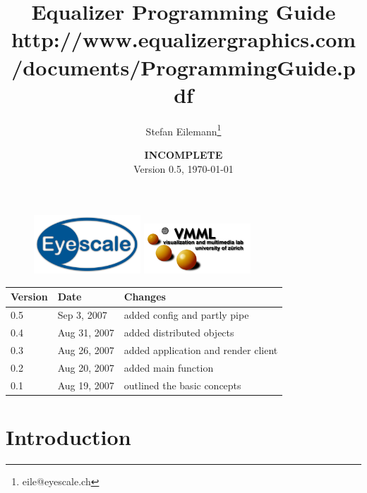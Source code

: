 \documentclass[10pt,a4]{scrartcl}
\title{Equalizer Programming Guide\\
  {\footnotesize\mdseries
    \htmladdnormallink{http://www.equalizergraphics.com/documents/Developer/ProgrammingGuide.pdf}
    {http://www.equalizergraphics.com/documents/ProgrammingGuide.pdf}}
}
\author{Stefan Eilemann\thanks{eile@eyescale.ch}\\[\medskipamount]
}
\date{
  \textbf{INCOMPLETE}\\[\medskipamount]
  Version 0.5, \today
}
\begin{document}
\maketitle
\vfill
\lstset{language=C++}

\thispagestyle{empty}
\begin{figure}[ht]
  \hfill
  \includegraphics[width=4cm]{images/logo.pdf}\hfill
  \includegraphics[width=4cm]{images/vmml.pdf}\hfill\vspace{-1em}\\
\end{figure}
\vfill


\vfill{\center\begin{tabularx}{\textwidth}{|l|l|X|}
    \hline
    \bf Version & \bf Date     & \bf Changes \\
    \hline
    0.5         & Sep 3, 2007  & added config and partly pipe\\
    0.4         & Aug 31, 2007 & added distributed objects\\
    0.3         & Aug 26, 2007 & added application and render client\\
    0.2         & Aug 20, 2007 & added main function\\
    0.1         & Aug 19, 2007 & outlined the basic concepts\\
    \hline
  \end{tabularx}}

\clearpage
\tableofcontents
\thispagestyle{empty}

\clearpage
{}



\section{Introduction}
\end{document}
